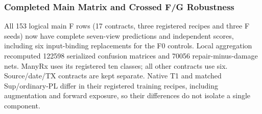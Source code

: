 \subsubsection{Completed Main Matrix and Crossed F/G Robustness}

All 153 logical main F rows (17 contracts, three registered recipes and three F seeds) now have complete seven-view predictions and independent scores, including six input-binding replacements for the F0 controls. Local aggregation recomputed 122598 serialized confusion matrices and 70056 repair-minus-damage nets. ManyRx uses its registered ten classes; all other contracts use six. Source/date/TX contracts are kept separate. Native T1 and matched Sup/ordinary-PL differ in their registered training recipes, including augmentation and forward exposure, so their differences do not isolate a single component.

